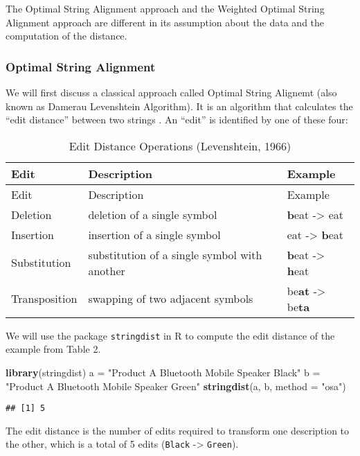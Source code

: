 \documentclass[]{article}
\newenvironment{Shaded}{\begin{snugshade}}{\end{snugshade}}
\newcommand{\KeywordTok}[1]{\textcolor[rgb]{0.13,0.29,0.53}{\textbf{{#1}}}}
\newcommand{\DataTypeTok}[1]{\textcolor[rgb]{0.13,0.29,0.53}{{#1}}}
\newcommand{\StringTok}[1]{\textcolor[rgb]{0.31,0.60,0.02}{{#1}}}
\newcommand{\NormalTok}[1]{{#1}}
\begin{document}
The Optimal String Alignment approach and the Weighted Optimal String
Alignment approach are different in its assumption about the data and
the computation of the distance.

\subsubsection{Optimal String Alignment}\label{optimal-string-alignment}

We will first discuss a classical approach called Optimal String
Alignemt (also known as Damerau Levenshtein Algorithm). It is an
algorithm that calculates the ``edit distance'' between two strings
\cite{Leven1966}. An ``edit'' is identified by one of these four:

\begin{longtable}[]{@{}lll@{}}
\caption{Edit Distance Operations (Levenshtein, 1966)}\tabularnewline
\toprule
Edit & Description & Example\tabularnewline
\midrule
\endfirsthead
\toprule
Edit & Description & Example\tabularnewline
\midrule
\endhead
Deletion & deletion of a single symbol & \textbf{b}eat -\textgreater{}
eat\tabularnewline
Insertion & insertion of a single symbol & eat -\textgreater{}
\textbf{b}eat\tabularnewline
Substitution & substitution of a single symbol with another &
\textbf{b}eat -\textgreater{} \textbf{h}eat\tabularnewline
Transposition & swapping of two adjacent symbols & be\textbf{at}
-\textgreater{} be\textbf{ta}\tabularnewline
\bottomrule
\end{longtable}

We will use the package \texttt{stringdist} in R to compute the edit
distance of the example from Table 2.

\begin{Shaded}
\begin{Highlighting}[]
\KeywordTok{library}\NormalTok{(stringdist)}
\NormalTok{a =}\StringTok{ "Product A Bluetooth Mobile Speaker Black"}
\NormalTok{b =}\StringTok{ "Product A Bluetooth Mobile Speaker Green"}
\KeywordTok{stringdist}\NormalTok{(a, b, }\DataTypeTok{method =} \StringTok{"osa"}\NormalTok{)}
\end{Highlighting}
\end{Shaded}

\begin{verbatim}
## [1] 5
\end{verbatim}

The edit distance is the number of edits required to transform one
description to the other, which is a total of 5 edits (\texttt{Black}
-\textgreater{} \texttt{Green}).
\end{document}
